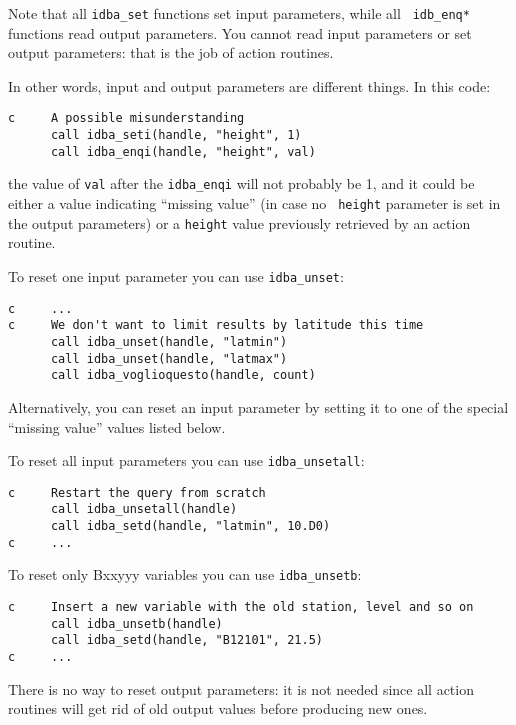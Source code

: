 \documentclass[final,12pt,a4paper,twoside]{book}
\begin{document}
Note that all {\tt idba\_set} functions set input parameters, while all {\tt
idb\_enq*} functions read output parameters.  You cannot read input parameters
or set output parameters: that is the job of action routines.

In other words, input and output parameters are different things.  In this
code:

\begin{verbatim}
c     A possible misunderstanding
      call idba_seti(handle, "height", 1)
      call idba_enqi(handle, "height", val)
\end{verbatim}

the value of {\tt val} after the {\tt idba\_enqi} will not probably be 1, and
it could be either a value indicating ``missing value'' (in case no {\tt
height} parameter is set in the output parameters) or a {\tt height} value
previously retrieved by an action routine.

To reset one input parameter you can use {\tt idba\_unset}:
\label{fun-idba_unset}

\begin{verbatim}
c     ...
c     We don't want to limit results by latitude this time
      call idba_unset(handle, "latmin")
      call idba_unset(handle, "latmax")
      call idba_voglioquesto(handle, count)
\end{verbatim}

Alternatively, you can reset an input parameter by setting it to one of the
special ``missing value'' values listed below.

To reset all input parameters you can use {\tt idba\_unsetall}:
\label{fun-idba_unsetall}

\begin{verbatim}
c     Restart the query from scratch
      call idba_unsetall(handle)
      call idba_setd(handle, "latmin", 10.D0)
c     ...
\end{verbatim}

To reset only Bxxyyy variables you can use {\tt idba\_unsetb}:
\label{fun-idba_unsetall}

\begin{verbatim}
c     Insert a new variable with the old station, level and so on
      call idba_unsetb(handle)
      call idba_setd(handle, "B12101", 21.5)
c     ...
\end{verbatim}

There is no way to reset output parameters: it is not needed since all action
routines will get rid of old output values before producing new ones.
\end{document}
